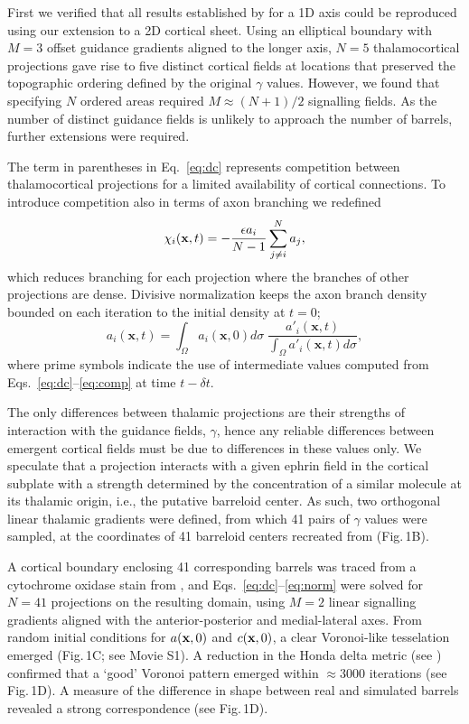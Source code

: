 \documentclass[9pt,twocolumn,twoside,lineno]{pnas-new}
\begin{document}
First we verified that all results established by \cite{karbowski_model_2004} for a 1D axis could be reproduced using our extension to a 2D cortical sheet. Using an elliptical boundary with $M=3$ offset guidance gradients aligned to the longer axis, $N=5$ thalamocortical projections gave rise to five distinct cortical fields at locations that preserved the topographic ordering defined by the original $\gamma$ values. However, we found that specifying $N$ ordered areas required $M\approx (N+1)/2$ signalling fields. As the number of distinct guidance fields is unlikely to approach the number of barrels, further extensions were required.

The term in parentheses in Eq.~\ref{eq:dc} represents competition between thalamocortical projections for a limited availability of cortical connections. To introduce competition also in terms of axon branching we redefined
%
\begin{equation} \label{eq:comp}
\chi_i(\mathbf{x}, t) = - \frac{\epsilon  a_i}{N-1} \sum_{j \ne i}^{N} a_{j},
\end{equation}
%
which reduces branching for each projection where the branches of other projections are dense. Divisive normalization keeps the axon branch density bounded on each iteration to the initial density  at $t=0$;
%
\begin{equation} \label{eq:norm}
  a_i(\mathbf{x}, t) = \int_\Omega  a_i(\mathbf{x}, 0) d\sigma \; \frac {a'_i(\mathbf{x}, t)} {\int_\Omega
  a'_i(\mathbf{x}, t) d\sigma},
\end{equation}
%
where prime symbols indicate the use of intermediate values computed from Eqs.~\ref{eq:dc}--\ref{eq:comp} at time $t-{\delta}t$.

The only differences between thalamic projections are their strengths of interaction with the guidance fields, $\gamma$, hence any reliable differences between emergent cortical fields must be due to differences in these values only. We speculate that a projection interacts with a given ephrin field in the cortical subplate with a strength determined by the concentration of a similar molecule at its thalamic origin, i.e., the putative barreloid center. As such, two orthogonal linear thalamic gradients were defined, from which 41 pairs of $\gamma$ values were sampled, at the coordinates of 41 barreloid centers recreated from \cite{haidarliu_size_2001} (Fig.\,1B).

A cortical boundary enclosing 41 corresponding barrels was traced from a cytochrome oxidase stain from \cite{zheng_signal_2001}, and Eqs.~\ref{eq:dc}--\ref{eq:norm} were solved for $N=41$ projections on the resulting domain, using $M=2$ linear signalling gradients aligned with the anterior-posterior and medial-lateral axes. From random initial conditions for $a({\bf x},0)$ and $c({\bf x},0)$, a clear Voronoi-like tesselation emerged (Fig.\,1C; see Movie S1). A reduction in the Honda delta metric (see \cite{senft_mouse_1991}) confirmed that a `good' Voronoi pattern emerged within $\approx 3000$ iterations (see Fig.\,1D). A measure of the difference in shape between real and simulated barrels revealed a strong correspondence (see Fig.\,1D).
\end{document}
